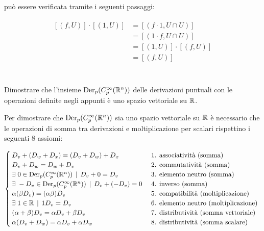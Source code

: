 può essere verificata tramite i seguenti passaggi:

\begin{align}
	\begin{split}
		[(f,U)] \cdot [(1,U)] &= [(f \cdot 1,U \cap U)]\\
		&= [(1 \cdot f,U \cap U)]\\
		&= [(1,U)] \cdot [(f,U)]\\
		&= [(f,U)]
	\end{split}
\end{align}

%

\newpage

%

\section{}\label{es1-8}

\begin{tcolorbox}
	Dimostrare che l'insieme $ \operatorname{Der}_{p}(C_{p}^{\infty}(\mathbb{R}^{n})) $ delle derivazioni puntuali con le operazioni definite negli appunti è uno spazio vettoriale su $ \mathbb{R} $.
\end{tcolorbox}

Per dimostrare che $ \operatorname{Der}_{p}(C_{p}^{\infty}(\mathbb{R}^{n})) $ sia uno spazio vettoriale su $ \mathbb{R} $ è necessario che le operazioni di somma tra derivazioni e moltiplicazione per scalari rispettino i seguenti 8 assiomi:

\begin{equation}
	\begin{cases}
		D_{v} + (D_{w} + D_{x}) = (D_{v} + D_{w}) + D_{x} & \text{ 1. associatività (somma) }\\
		D_{v} + D_{w} = D_{w} + D_{v} & \text{ 2. commutatività (somma) }\\
		\exists \; 0 \in \operatorname{Der}_{p}(C_{p}^{\infty}(\mathbb{R}^{n})) \, \mid \, D_{v} + 0 = D_{v} & \text{ 3. elemento neutro (somma) }\\
		\exists \; - D_{v} \in \operatorname{Der}_{p}(C_{p}^{\infty}(\mathbb{R}^{n})) \, \mid \, D_{v} + (- D_{v}) = 0 & \text{ 4. inverso (somma) }\\
		\alpha (\beta D_{v}) = (\alpha \beta) D_{v} & \text{ 5. compatibilità (moltiplicazione) }\\
		\exists \; 1 \in \mathbb{R} \, \mid \, 1 D_{v} = D_{v} & \text{ 6. elemento neutro (moltiplicazione) }\\
		(\alpha + \beta) D_{v} = \alpha D_{v} + \beta D_{v} & \text{ 7. distributività (somma vettoriale) }\\
		\alpha (D_{v} + D_{w}) = \alpha D_{v} + \alpha D_{w} & \text{ 8. distributività (somma scalare) }
	\end{cases}
\end{equation}

